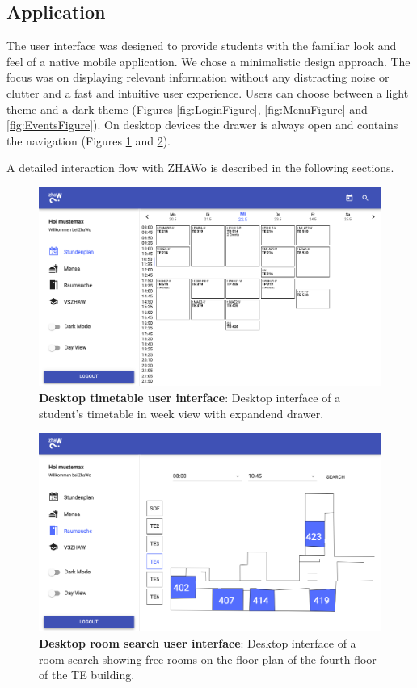 \begin{markdown}
\section{Application} \label{application}

The user interface was designed to provide students with the familiar look and feel of a native mobile application. We chose a minimalistic design approach. The focus was on displaying relevant information without any distracting noise or clutter and a fast and intuitive user experience. Users can choose between a light theme and a dark theme (Figures \ref{fig:LoginFigure}, \ref{fig:MenuFigure} and \ref{fig:EventsFigure}).
On desktop devices the drawer is always open and contains the navigation (Figures \ref{fig:DesktopSchedule} and \ref{fig:DesktopRoomsearch}).

A detailed interaction flow with ZHAWo is described in the following sections.
\begin{figure}[H]
  \includegraphics[width=12cm, center]{./figures/desktop_schedule.png}
  \captionsetup{width=11.5cm}
  \caption[Desktop timetable user interface]{\textbf{Desktop timetable user interface}: Desktop interface of a student's timetable in week view with expandend drawer.}
  \label{fig:DesktopSchedule}
\end{figure}

\begin{figure}[H]
  \includegraphics[width=12cm, center]{./figures/desktop_roomsearch.png}
  \captionsetup{width=11.5cm}
  \caption[Desktop room search user interface]{\textbf{Desktop room search user interface}: Desktop interface of a room search showing free rooms on the floor plan of the fourth floor of the TE building.}
  \label{fig:DesktopRoomsearch}
\end{figure}


\end{markdown}
